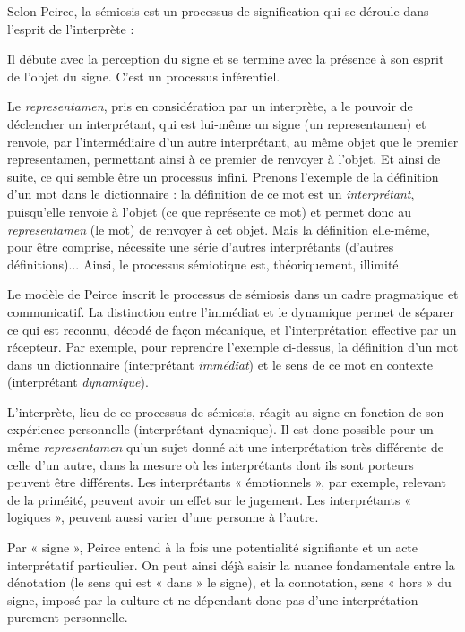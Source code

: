 Selon Peirce, la sémiosis est un processus de signification qui se déroule dans l’esprit de l’interprète :
\begin{lecture}{}
Il débute avec la perception du signe et se termine avec la présence à son esprit de l’objet du signe. C’est un processus inférentiel.
\end{lecture}
Le \textit{representamen}, pris en considération par un interprète, a le pouvoir de déclencher un interprétant, qui est lui-même un signe (un representamen) et renvoie, par l’intermédiaire d’un autre interprétant, au même objet que le premier representamen, permettant ainsi à ce premier de renvoyer à l’objet. Et ainsi de suite, ce qui semble être un processus infini. Prenons l’exemple de la définition d’un mot dans le dictionnaire : la définition de ce mot est un \textit{interprétant}, puisqu’elle renvoie à l’objet (ce que représente ce mot) et permet donc au \textit{representamen} (le mot) de renvoyer à cet objet. Mais la définition elle-même, pour être comprise, nécessite une série d’autres interprétants (d’autres définitions)... Ainsi, le processus sémiotique est, théoriquement, illimité.

Le modèle de Peirce inscrit le processus de sémiosis dans un cadre pragmatique et communicatif. La distinction entre l’immédiat et le dynamique permet de séparer ce qui est reconnu, décodé de façon mécanique, et l’interprétation effective par un récepteur. Par exemple, pour reprendre l’exemple ci-dessus, la définition d’un mot dans un dictionnaire (interprétant \textit{immédiat}) et le sens de ce mot en contexte (interprétant \textit{dynamique}).

L’interprète, lieu de ce processus de sémiosis, réagit au signe en fonction de son expérience personnelle (interprétant dynamique). Il est donc possible pour un même \textit{representamen} qu’un sujet donné ait une interprétation très différente de celle d’un autre, dans la mesure où les interprétants dont ils sont porteurs peuvent être différents. Les interprétants « émotionnels », par exemple, relevant de la priméité, peuvent avoir un effet sur le jugement. Les interprétants « logiques », peuvent aussi varier d’une personne à l’autre.

Par « signe », Peirce entend à la fois une potentialité signifiante et un acte interprétatif particulier. On peut ainsi déjà saisir la nuance fondamentale entre la dénotation (le sens qui est « dans » le signe), et la connotation, sens « hors » du signe, imposé par la culture et ne dépendant donc pas d’une interprétation purement personnelle.

